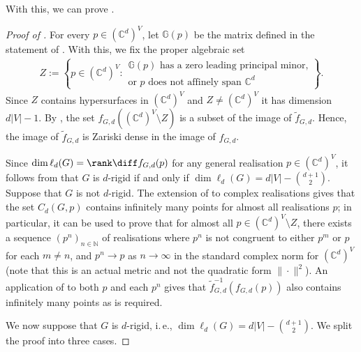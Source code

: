With this, we can prove .


\begin{proof}[Proof of ]
	For every $p \in (\mathbb{C}^d)^V$,
	let $\mathbb{G}(p)$ be the matrix defined in the statement of .
	With this, we fix the proper algebraic set
	\begin{align*}
		Z := \left\{ p \in (\mathbb{C}^d)^V :
			\begin{array}{l}
				\text{$\mathbb{G}(p)$ has a zero leading principal minor,}\\
				\text{or $p$ does not affinely span $\mathbb{C}^d$}
			\end{array}
		 \right\}.
	\end{align*}
	Since $Z$ contains hypersurfaces in $(\mathbb{C}^d)^V$ and $Z \neq (\mathbb{C}^d)^V$
	it has dimension $d|V|-1$.
	By ,
	the set $f_{G,d}((\mathbb{C}^d)^V \setminus Z)$ is a subset of the image of $\tilde{f}_{G,d}$.	
	Hence, the image of $\tilde{f}_{G,d}$ is Zariski dense in the image of $f_{G,d}$.
	
	Since $\dim \ell_d(G) = \rank \diff f_{G,d}(p)$ for any general realisation $p\in (\mathbb{C}^d)^V$,
	it follows from  that $G$ is $d$-rigid if and only if $\dim \ell_d(G) = d|V|- \binom{d+1}{2}$.
	Suppose that $G$ is not $d$-rigid.
	The extension of  to complex realisations gives that the set $C_d(G,p)$ contains infinitely many points for almost all realisations $p$;
	in particular,
	it can be used to prove that for almost all $p \in (\mathbb{C}^d)^V \setminus Z$,
	there exists a sequence $(p^n)_{n \in \mathbb{N}}$ of realisations where $p^n$ is not congruent to either $p^m$ or $p$ for each $m \neq n$, and $p^n \rightarrow p$ as $n \rightarrow \infty$ in the standard complex norm for $(\mathbb{C}^d)^V$ (note that this is an actual metric and not the quadratic form $\| \cdot\|^2$).
	An application of  to both $p$ and each $p^n$ gives that $\tilde{f}_{G,d}^{-1}\left(f_{G,d}(p)\right)$ also contains infinitely many points as is required.
	
	We now suppose that $G$ is $d$-rigid,
	i.\,e., $\dim \ell_d(G) = d|V|- \binom{d+1}{2}$.
	We split the proof into three cases.
	

\end{proof}
